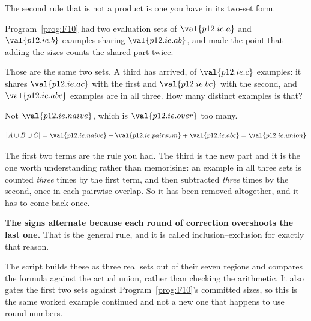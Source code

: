 \begin{fr}
The second rule that is not a product is one you have in its two-set form.

Program~\ref{prog:F10} had two evaluation sets of $\val{p12.ie.a}$ and
$\val{p12.ie.b}$ examples sharing $\val{p12.ie.ab}$, and made the point that
adding the sizes counts the shared part twice.

Those are the same two sets. A third has arrived, of $\val{p12.ie.c}$
examples: it shares $\val{p12.ie.ac}$ with the first and $\val{p12.ie.bc}$
with the second, and $\val{p12.ie.abc}$ examples are in all three. How many
distinct examples is that?
\dotline
\nextframe
\end{fr}

\begin{fr}
Not $\val{p12.ie.naive}$, which is $\val{p12.ie.over}$ too many.

\[ \lvert A \cup B \cup C \rvert = \val{p12.ie.naive}
   - \val{p12.ie.pairsum} + \val{p12.ie.abc} = \val{p12.ie.union} \]

The first two terms are the rule you had. The third is the new part and it is
the one worth understanding rather than memorising: an example in all three
sets is counted \emph{three} times by the first term, and then subtracted
\emph{three} times by the second, once in each pairwise overlap. So it has
been removed altogether, and it has to come back once.

\textbf{The signs alternate because each round of correction overshoots the
last one.} That is the general rule, and it is called inclusion--exclusion for
exactly that reason.

\begin{note}
The script builds these as three real sets out of their seven regions and
compares the formula against the actual union, rather than checking the
arithmetic. It also gates the first two sets against
Program~\ref{prog:F10}'s committed sizes, so this is the same worked example
continued and not a new one that happens to use round numbers.
\end{note}
\end{fr}

